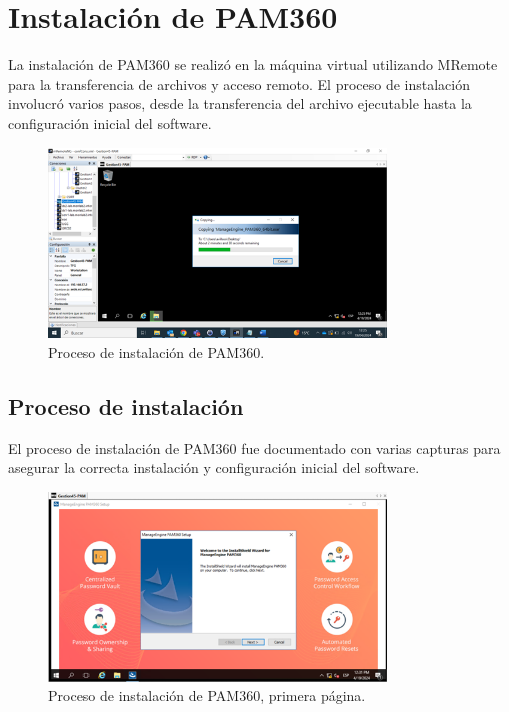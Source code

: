 \section{Instalación de PAM360}
La instalación de PAM360 se realizó en la máquina virtual utilizando MRemote para la transferencia de archivos y acceso remoto. El proceso de instalación involucró varios pasos, desde la transferencia del archivo ejecutable hasta la configuración inicial del software.

\begin{figure}[H]
	\centering
	\includegraphics[width=0.8\textwidth]{./img/instalacion_pam.png}
	\caption{Proceso de instalación de PAM360.}
	\label{fig:instalacion_pam}
\end{figure}

\subsection{Proceso de instalación}
El proceso de instalación de PAM360 fue documentado con varias capturas para asegurar la correcta instalación y configuración inicial del software.

\begin{figure}[H]
	\centering
	\includegraphics[width=0.8\textwidth]{./img/instalacion_pam2.png}
	\caption{Proceso de instalación de PAM360, primera página.}
	\label{fig:instalacion_detalle1}
\end{figure}


